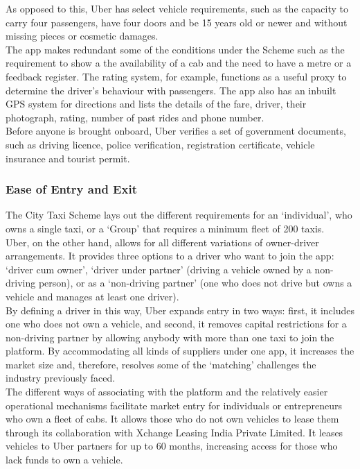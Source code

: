 \documentclass[a4paper, 12pt]{article}
\begin{document}
As opposed to this, Uber has select vehicle requirements, such as the capacity to carry four passengers, have four doors and be 15 years old or newer and without missing pieces or cosmetic damages.\\

The app makes redundant some of the conditions under the Scheme such as the requirement to show a the availability of a cab and the need to have a metre or a feedback register. The rating system, for example, functions as a useful proxy to determine the driver’s behaviour with passengers. The app also has an inbuilt GPS system for directions and lists the details of the fare, driver, their photograph, rating, number of past rides and phone number.\\

Before anyone is brought onboard, Uber verifies a set of government documents, such as driving licence, police verification, registration certificate, vehicle insurance and tourist permit.

\subsubsection{Ease of Entry and Exit}
The City Taxi Scheme lays out the different requirements for an ‘individual’, who owns a single taxi, or a ‘Group’ that requires a minimum fleet of 200 taxis. \\

Uber, on the other hand, allows for all different variations of owner-driver arrangements. It provides three options to a driver who want to join the app: ‘driver cum owner’, ‘driver under partner’ (driving a vehicle owned by a non-driving person), or as a ‘non-driving partner’ (one who does not drive but owns a vehicle and manages at least one driver).\\

By defining a driver in this way, Uber expands entry in two ways: first, it includes one who does not own a vehicle, and second, it removes capital restrictions for a non-driving partner by allowing anybody with more than one taxi to join the platform. By accommodating all kinds of suppliers under one app, it increases the market size and, therefore, resolves some of the ‘matching’ challenges the industry previously faced. \\

The different ways of associating with the platform and the relatively easier operational mechanisms facilitate market entry for individuals or entrepreneurs who own a fleet of cabs. It allows those who do not own vehicles to lease them through its collaboration with Xchange Leasing India Private Limited. It leases vehicles to Uber partners for up to 60 months, increasing access for those who lack funds to own a vehicle. \\
\end{document}
